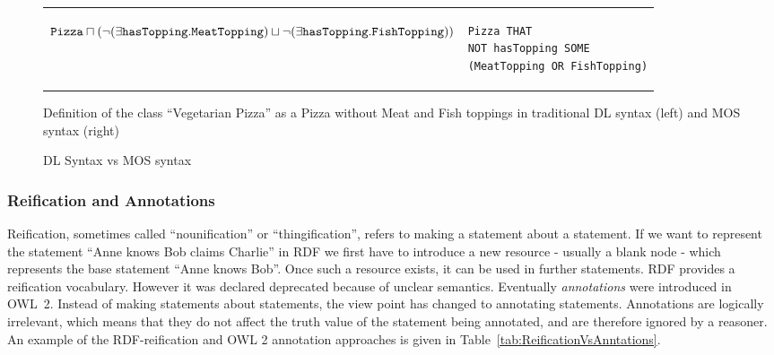 \begin{figure}[!h]
\centering
\begin{tabular}{ll}
\begin{minipage}[t]{0.4\textwidth}
\begin{scriptsize}
\begin{math}
\texttt{Pizza} \sqcap (\\
\neg (\exists \texttt{hasTopping}.\texttt{MeatTopping}) \sqcup \\
\neg (\exists \texttt{hasTopping}.\texttt{FishTopping}) )
\end{math}
\end{scriptsize}
\end{minipage}
&
\begin{minipage}[t]{0.4\textwidth}
\begin{scriptsize}
\begin{verbatim}
Pizza THAT
NOT hasTopping SOME
(MeatTopping OR FishTopping)
\end{verbatim}
\end{scriptsize}
\end{minipage}
\end{tabular}
\caption{DL Syntax vs MOS syntax}
\label{fig:MOSExample}
Definition of the class ``Vegetarian Pizza'' as a Pizza without Meat
and Fish toppings in traditional DL syntax (left) and MOS syntax (right)
\end{figure}

\subsubsection{Reification and Annotations}
Reification, sometimes called ``nounification'' or ``thingification'', refers
to making a statement about a statement. If we want to represent the
statement ``Anne knows Bob claims Charlie'' in RDF we first have to introduce a
new resource - usually a blank node - which represents the base statement
``Anne knows Bob''. Once such a resource exists, it can be used in further
statements. RDF provides a reification vocabulary. However it was
declared deprecated because of unclear semantics.
Eventually \emph{annotations} were introduced in \mbox{OWL 2}.
Instead of making statements about statements, the view point has changed to
annotating statements. Annotations are logically irrelevant, which means that
they do not affect the truth value of the statement being annotated, and are
therefore ignored by a reasoner. An example of the RDF-reification and OWL 2
annotation approaches is given in Table~\ref{tab:ReificationVsAnntations}.

